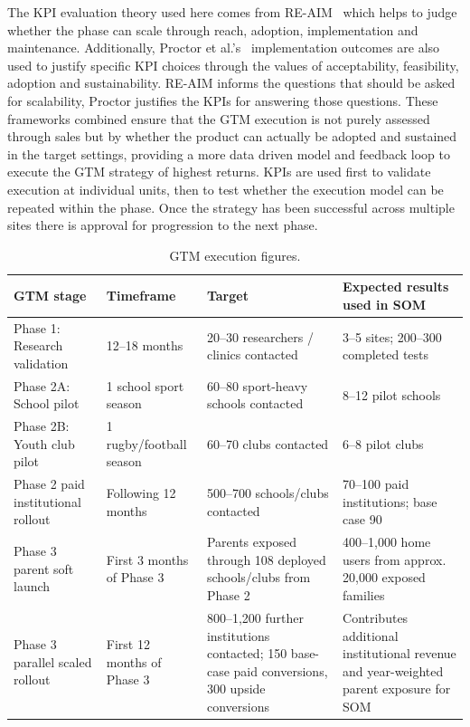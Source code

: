 The KPI evaluation theory used here comes from RE-AIM~\cite{reaim_framework} which helps to judge whether the phase can scale through reach, adoption, implementation and maintenance. Additionally, Proctor et al.'s~\cite{proctor2011implementation} implementation outcomes are also used to justify specific KPI choices through the values of acceptability, feasibility, adoption and sustainability. RE-AIM informs the questions that should be asked for scalability, Proctor justifies the KPIs for answering those questions. These frameworks combined ensure that the GTM execution is not purely assessed through sales but by whether the product can actually be adopted and sustained in the target settings, providing a more data driven model and feedback loop to execute the GTM strategy of highest returns. KPIs are used first to validate execution at individual units, then to test whether the execution model can be repeated within the phase. Once the strategy has been successful across multiple sites there is approval for progression to the next phase.

\begin{table}[htbp]
    \centering
    \footnotesize
    \caption{GTM execution figures.}
    \label{tab:ent-gtm-execution-figures}
    \begin{tabular}{p{3.2cm}p{2.6cm}p{4.0cm}p{4.5cm}}
        \toprule
        \textbf{GTM stage} & \textbf{Timeframe} & \textbf{Target} & \textbf{Expected results used in SOM} \\
        \midrule
        Phase 1: Research validation & 12--18 months & 20--30 researchers / clinics contacted & 3--5 sites; 200--300 completed tests \\
        Phase 2A: School pilot & 1 school sport season & 60--80 sport-heavy schools contacted & 8--12 pilot schools \\
        Phase 2B: Youth club pilot & 1 rugby/football season & 60--70 clubs contacted & 6--8 pilot clubs \\
        Phase 2 paid institutional rollout & Following 12 months & 500--700 schools/clubs contacted & 70--100 paid institutions; base case 90 \\
        Phase 3 parent soft launch & First 3 months of Phase 3 & Parents exposed through 108 deployed schools/clubs from Phase 2 & 400--1,000 home users from approx. 20,000 exposed families \\
        Phase 3 parallel scaled rollout & First 12 months of Phase 3 & 800--1,200 further institutions contacted; 150 base-case paid conversions, 300 upside conversions & Contributes additional institutional revenue and year-weighted parent exposure for SOM \\
        \bottomrule
    \end{tabular}
\end{table}

